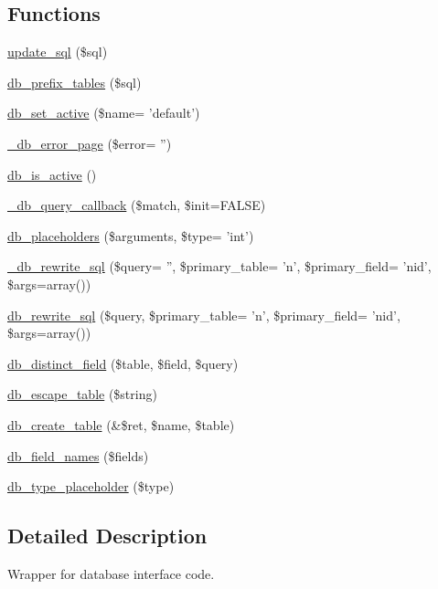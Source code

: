 \subsection*{Functions}
\begin{CompactItemize}
\item 
\hyperlink{group__database_g67680310ffaf72da52a9c2453325c0fb}{update\_\-sql} (\$sql)
\item 
\hyperlink{group__database_gdb274339376ae7e48e3ea4da4c1de0b1}{db\_\-prefix\_\-tables} (\$sql)
\item 
\hyperlink{group__database_g84e68f6dbf9cdec826e7b3852d1b283c}{db\_\-set\_\-active} (\$name= 'default')
\item 
\hyperlink{group__database_g5aab9d68ecdc1712369d5d1ef64d455c}{\_\-db\_\-error\_\-page} (\$error= '')
\item 
\hyperlink{group__database_g19eaaae8681bb72e7476ef0aa0a5d01f}{db\_\-is\_\-active} ()
\item 
\hyperlink{group__database_g337493a6287b3b48a5a2ba6d74e844bf}{\_\-db\_\-query\_\-callback} (\$match, \$init=FALSE)
\item 
\hyperlink{group__database_g8d4c967b43af1b9d9fec0466102c490c}{db\_\-placeholders} (\$arguments, \$type= 'int')
\item 
\hyperlink{group__database_g1c87af009b401cd8d695952f9eee20a9}{\_\-db\_\-rewrite\_\-sql} (\$query= '', \$primary\_\-table= 'n', \$primary\_\-field= 'nid', \$args=array())
\item 
\hyperlink{group__database_g0869f72f75d16bd0f9a52eaafa02e091}{db\_\-rewrite\_\-sql} (\$query, \$primary\_\-table= 'n', \$primary\_\-field= 'nid', \$args=array())
\item 
\hyperlink{group__database_gf07060b05ac825ab9d7bbb3ece2a699f}{db\_\-distinct\_\-field} (\$table, \$field, \$query)
\item 
\hyperlink{group__database_g5f9fd89ca517eed3dfd7f128c3d65dd1}{db\_\-escape\_\-table} (\$string)
\item 
\hyperlink{group__schemaapi_gb7a73e88621851e4bed62fd6063eb2f9}{db\_\-create\_\-table} (\&\$ret, \$name, \$table)
\item 
\hyperlink{group__schemaapi_geb423ba53e5133548abe3d999f86e787}{db\_\-field\_\-names} (\$fields)
\item 
\hyperlink{group__schemaapi_g1d594f0ad0eab77e4b925887be7e4b08}{db\_\-type\_\-placeholder} (\$type)
\end{CompactItemize}


\subsection{Detailed Description}
Wrapper for database interface code. 

